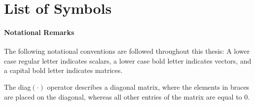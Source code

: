 \chapter*{List of Symbols}

\subsubsection*{Notational Remarks}
The following notational conventions are followed throughout this thesis: A lower case regular letter indicates scalars, a lower case bold letter indicates vectors, and a capital bold letter indicates matrices.


The diag$(\cdot)$ operator describes a diagonal matrix, where the elements in braces are placed on the diagonal, whereas all other entries of the matrix are equal to 0.



\newcommand{\prp}{\bm\phi}

\newcommand{\p}{\bm p}
\newcommand{\ps}{\p_s}
\newcommand{\pr}{\p_m^i}
\newcommand{\pall}{\mathcal{P}}
\newcommand{\pinp}{\p \in \pall}

\newcommand{\psip}{\bm\psi_{\bm p}}
\newcommand{\psiRlast}{\bm\psi_R^{(t-1)}}
\newcommand{\psiRPlast}{\psi_{\bm p,R}^{(t-1)}}
\newcommand{\psiRnow}{\bm\psi_R^{(t)}}
\newcommand{\psiRPnow}{\psi_{\bm p,R}^{(t)}}
\newcommand{\psips}{\psi_{\bm p,s}}

\newcommand{\gaussian}[1]{\mathcal{N}\left (#1\right )}
\newcommand{\pdffunc}{\psi_{\bm p}^{(l-1)}\prod_{m}\mathcal{N}^c\left (\phi^k_m(t,k);\tilde\phi^k_m(\bm p),\sigma^{2,(l-1)}\right )}
\newcommand{\pdffuncR}{\psi_{\bm p,R}^{(t-1)}\prod_{m}\mathcal{N}^c\left (\phi^k_m(t,k);\tilde\phi^k_m(\bm p),\sigma_R^{2,(t-1)}\right )}
\newcommand{\gauss}{\mathcal{N}^c\big(\phi_m(t,k);\tilde\phi^k_m,\sigma^2\big)}
\newcommand{\Q}{\mathcal{Q}\left (\theta\vert\theta^{(l-1)}\right )}
\newcommand{\mulast}{h^{(l)}(t,k,\bm p)}
\newcommand{\muRlast}{h(t,k,\bm p)}
\newcommand{\z}{z(t,k,\bm p)}
\newcommand{\lcompl}{\prod_{t,k}\sum_{\vect{p}}\psip\cdot\z\prod_{m}\gauss}

